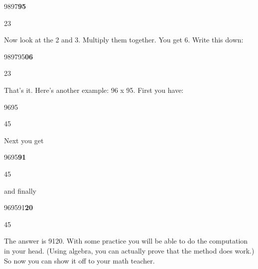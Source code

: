 \documentclass[
]{article}
\begin{document}
9897\textbf{95}

23

Now look at the 2 and 3. Multiply them together. You get 6. Write this
down:

989795\textbf{06}

23

That's it. Here's another example: 96 x 95. First you have:

9695

45

\hfill\break
Next you get

9695\textbf{91}

45

and finally

969591\textbf{20}

45

The answer is 9120. With some practice you will be able to do the
computation in your head. (Using algebra, you can actually prove that
the method does work.) So now you can show it off to your math teacher.
\end{document}
